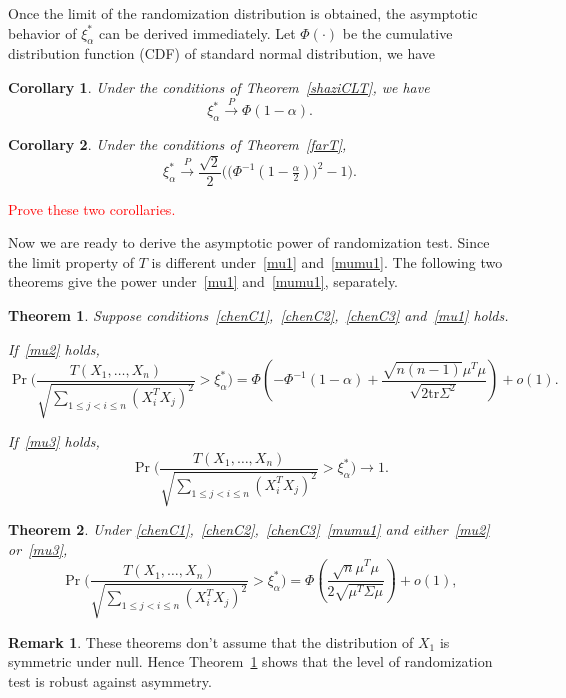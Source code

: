 \documentclass[review]{elsarticle}
\theoremstyle{plain}
\newtheorem{theorem}{\quad\quad Theorem}
\newtheorem{corollary}{\quad\quad Corollary}
\theoremstyle{definition}
\newtheorem{remark}{\quad\quad Remark}
\theoremstyle{remark}
\begin{document}
Once the limit of the randomization distribution is obtained, the asymptotic behavior of $\xi_{\alpha}^*$ can be derived immediately.
Let $\Phi(\cdot)$ be the cumulative distribution function (CDF) of standard normal distribution, we have
\begin{corollary}\label{corollaryQuan}
    Under the conditions of Theorem~\ref{shaziCLT}, we have
    $$\xi_{\alpha}^*\xrightarrow{P} \Phi(1-\alpha).$$
\end{corollary}

\begin{corollary}\label{corollaryQuan2}
    Under the conditions of Theorem~\ref{farT},
    $$\xi_{\alpha}^*\xrightarrow{P}\frac{\sqrt{2}}{2}\Big(\big(\Phi^{-1}(1-\tfrac{\alpha}{2})\big)^2-1\Big).$$
\end{corollary}

\textcolor{red}{Prove these two corollaries.}


Now we are ready to derive the asymptotic power of randomization test.
Since the limit property of $T$ is different under~\eqref{mu1} and~\eqref{mumu1}.
The following two theorems give the power under~\eqref{mu1} and~\eqref{mumu1}, separately.

\begin{theorem}\label{theoremPower}
    Suppose conditions~\eqref{chenC1},~\eqref{chenC2},~\eqref{chenC3} and~\eqref{mu1} holds.

    If~\eqref{mu2} holds,
    \begin{equation*}
            \Pr\Big(\frac{T( X_1,\ldots, X_n)}{\sqrt{\sum_{1\leq j<i\leq n}{(X_i^T X_j)}^2}}>\xi_{\alpha}^* \Big)
            =
            \Phi(-\Phi^{-1}(1-\alpha)+\frac{\sqrt{n(n-1)}\mu^T\mu}{\sqrt{2\mathrm{tr}\Sigma^2}})+o(1).
    \end{equation*}

    If~\eqref{mu3} holds,
    \begin{equation*}
            \Pr\Big(\frac{T( X_1,\ldots, X_n)}{\sqrt{\sum_{1\leq j<i\leq n}{(X_i^T X_j)}^2}}>\xi_{\alpha}^* \Big)\to 1.
    \end{equation*}
\end{theorem}

\begin{theorem}\label{theoremPower2}
    Under \eqref{chenC1},~\eqref{chenC2},~\eqref{chenC3}~\eqref{mumu1} and either~\eqref{mu2} or~\eqref{mu3},
    \begin{equation*}
            \Pr\Big(\frac{T( X_1,\ldots, X_n)}{\sqrt{\sum_{1\leq j<i\leq n}{(X_i^T X_j)}^2}}>\xi_{\alpha}^* \Big)
            =
            \Phi(\frac{\sqrt{n}\mu^T\mu}{2\sqrt{\mu^T \Sigma \mu}})+o(1),
    \end{equation*}
\end{theorem}
\begin{remark}
    These theorems don't assume that the distribution of $X_1$ is symmetric under null. Hence Theorem~\ref{theoremPower} shows that the level of randomization test is robust against asymmetry.
\end{remark}
\end{document}
